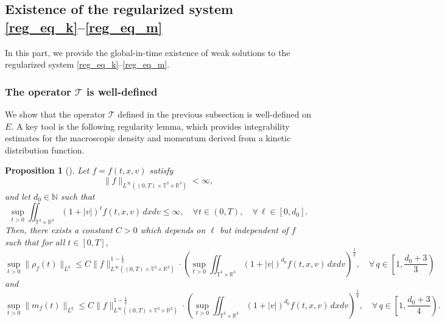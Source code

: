 \documentclass[10pt,reqno]{amsart}
\numberwithin{equation}{section}
\newtheorem{proposition}{Proposition}[section]
\newcommand{\R}{\mathbb R}
\newcommand{\N}{\mathbb N}
\newcommand{\T}{\mathbb T}
\newcommand{\lt}{\left}
\newcommand{\rt}{\right}
\newcommand{\mt}{\mathcal{T}}
\begin{document}
\subsection{Existence of the regularized system \eqref{reg_eq_k}--\eqref{reg_eq_m}} In this part, we provide the global-in-time existence of weak solutions to the regularized system \eqref{reg_eq_k}--\eqref{reg_eq_m}.

%
%
% 
%
%
\subsubsection{The operator $\mt$ is well-defined} 
We show that the operator $\mathcal{T}$ defined in the previous subsection is well-defined on $E$. A key tool is the following regularity lemma, which provides integrability estimates for the macroscopic density and momentum derived from a kinetic distribution function.
\begin{proposition}[{\cite[Proposition A.1]{CJ21}}]\label{PA.1}
Let $f = f(t,x,v)$ satisfy
\[
\|f\|_{L^\infty((0,T)\times \T^3 \times \R^3)}<\infty,
\]
and let $d_0 \in \N$ such that
\[
\sup_{t > 0}\iint_{\T^3 \times \R^3} (1+|v|)^\ell f(t,x,v)\,dxdv \le \infty, \quad \forall t \in (0,T), \quad \forall \, \ell \in [0,d_0].  
\]
Then, there exists a constant $C>0$ which depends on $\ell$ but independent of $f$ such that for all $t \in [0,T]$,
\[
\sup_{t >0}\|\rho_f (t)\|_{L^q} \le C\|f\|_{L^\infty((0,T)\times \T^3 \times \R^3)}^{1-\frac1q} \cdot \lt(\sup_{t > 0}\iint_{\T^3 \times \R^3} (1+|v|)^{d_0} f(t,x,v)\,dxdv\rt)^{\frac 1q}, \quad \forall \,q \in \left[1, \frac{d_0+3}3 \right)
\]
and
\[
 \sup_{t >0}\|m_f(t)\|_{L^q} \le C\|f\|_{L^\infty((0,T)\times \T^3 \times \R^3)}^{1-\frac1q} \cdot \lt(\sup_{t > 0}\iint_{\T^3 \times \R^3} (1+|v|)^{d_0} f(t,x,v)\,dxdv\rt)^{\frac 1q}, \quad \forall \, q \in \left[1, \frac{d_0+3}4 \right).
\]
\end{proposition}
\end{document}
